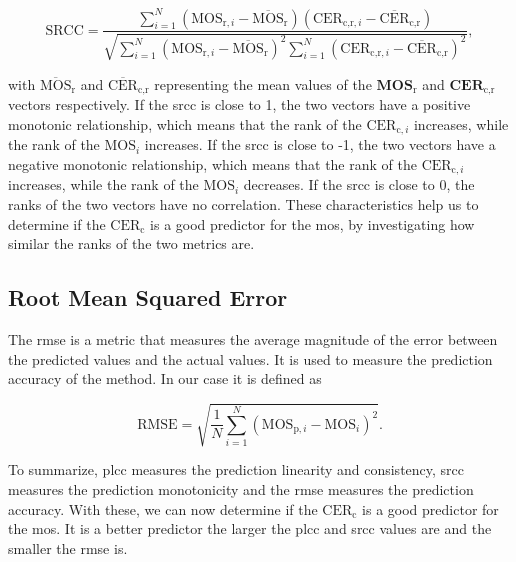 \begin{equation}
    \text{SRCC} = \frac{\sum_{i=1}^{N}{(\text{MOS}_{\text{r},i}-\overline{\text{MOS}}_{\text{r}})(\text{CER}_{\text{c,r},i}-\overline{\text{CER}}_{\text{c,r}})}}{\sqrt{\sum_{i=1}^{N}{(\text{MOS}_{\text{r},i}-\overline{\text{MOS}}_{\text{r}})^2}\sum_{i=1}^{N}{(\text{CER}_{\text{c,r},i}-\overline{\text{CER}}_{\text{c,r}})^2}}},
    \label{eq:spearman}
\end{equation}

with $\overline{\text{MOS}}_{\text{r}}$ and $\overline{\text{CER}}_{\text{c,r}}$ representing the mean values of the $\mathbf{MOS}_{\text{r}}$ and $\mathbf{CER}_{\text{c,r}}$ vectors respectively.
If the \gls{srcc} is close to 1, the two vectors have a positive monotonic relationship, which means that the rank of the $\text{CER}_{\text{c},i}$ increases, while the rank of the $\text{MOS}_{i}$ increases.
If the \gls{srcc} is close to -1, the two vectors have a negative monotonic relationship, which means that the rank of the $\text{CER}_{\text{c},i}$ increases, while the rank of the $\text{MOS}_{i}$ decreases.
If the \gls{srcc} is close to 0, the ranks of the two vectors have no correlation.
These characteristics help us to determine if the $\text{CER}_{\text{c}}$ is a good predictor for the \gls{mos}, by investigating how similar the ranks of the two metrics are.


\subsection{Root Mean Squared Error}
\label{subsec:rmse}

The \gls{rmse} is a metric that measures the average magnitude of the error between the predicted values and the actual values.
It is used to measure the prediction accuracy of the method.
In our case it is defined as

\begin{equation}
    \text{RMSE} = \sqrt{\frac{1}{N}\sum_{i=1}^{N}{(\text{MOS}_{\text{p},i} - \text{MOS}_{i})^2}}.
    \label{eq:rmse}
\end{equation}

To summarize, \gls{plcc} measures the prediction linearity and consistency, \gls{srcc} measures the prediction monotonicity and the \gls{rmse} measures the prediction accuracy.
With these, we can now determine if the $\text{CER}_{\text{c}}$ is a good predictor for the \gls{mos}.
It is a better predictor the larger the \gls{plcc} and \gls{srcc} values are and the smaller the \gls{rmse} is.



